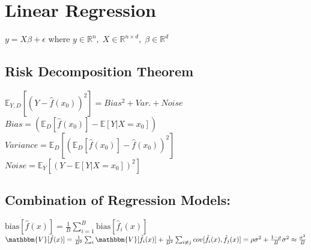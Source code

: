 

\section{Linear Regression}
\(y = X\beta + \epsilon\) where \(y \in \mathbb{R}^n, \;X \in \mathbb{R}^{n\times d},\;\beta \in \mathbb{R}^d\)

\subsection*{Risk Decomposition Theorem}
\(\mathbb{E}_{Y,D}\left[ \left( Y-\hat{f}(x_0)\right) ^2 \right] = Bias^2 + Var. + Noise\)\\
\(Bias =\left(\mathbb{E}_{D}\left[\hat{f}(x_0)\right] - \mathbb{E}\left[Y\vert X=x_0\right]\right)\)\\
\(Variance =  \mathbb{E}_{D}\left[ \left( \mathbb{E}_{D}\left[\hat{f}(x_0)\right]- \hat{f}(x_0)\right) ^2 \right]\)\\
\(Noise =  \mathbb{E}_{Y}\left[\left(Y-\mathbb{E}\left[Y\vert X=x_0\right]\right)^2\right] \)
\subsection*{Combination of Regression Models:}
$\text{bias}[\hat{f}(x)] = \frac{1}{B} \sum_{i=1}^{B} \text{bias}[\hat{f}_i(x)]$\\
{\scriptsize $\mathbbm{V}[\hat{f}(x)] = \frac{1}{B^2}\sum_i \mathbbm{V}[\hat{f}_i(x)]
+ \frac{1}{B^2}\sum_{i\neq j} cov[\hat{f}_i(x), \hat{f}_j(x)] = \rho \sigma^2 + \frac{1-\rho}{B}\sigma^2 \approx \frac{\sigma^2}{B}$}
